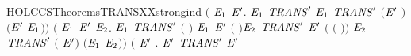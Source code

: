 \begin{SaveVerbatim}{HOLCCSTheoremsTRANSXXstrongind}
       \ensuremath{(}\HOLSymConst{\HOLTokenForall{}}  \ensuremath{\HOLBoundVar{E}\sb{\mathrm{1}}} \ensuremath{\HOLBoundVar{E}\sp{\prime}}.
             \HOLTokenTransBegin{}\HOLTokenTransEnd \ensuremath{\HOLBoundVar{E}\sb{\mathrm{1}}} \HOLSymConst{\HOLTokenConj{}} \ensuremath{\HOLBoundVar{TRANS}\sp{\prime}}   \ensuremath{\HOLBoundVar{E}\sb{\mathrm{1}}} \HOLSymConst{\HOLTokenImp{}}
            \ensuremath{\HOLBoundVar{TRANS}\sp{\prime}} \ensuremath{(}\ensuremath{\HOLBoundVar{E}\sp{\prime}} \HOLSymConst{\ensuremath{\mid}} \ensuremath{)}  \ensuremath{(}\ensuremath{\HOLBoundVar{E}\sp{\prime}} \HOLSymConst{\ensuremath{\mid}} \ensuremath{\HOLBoundVar{E}\sb{\mathrm{1}}}\ensuremath{)}\ensuremath{)} \HOLSymConst{\HOLTokenConj{}}
       \ensuremath{(}\HOLSymConst{\HOLTokenForall{}}  \ensuremath{\HOLBoundVar{E}\sb{\mathrm{1}}} \ensuremath{\HOLBoundVar{E}\sp{\prime}} \ensuremath{\HOLBoundVar{E}\sb{\mathrm{2}}}.
             \HOLTokenTransBegin{} \HOLTokenTransEnd \ensuremath{\HOLBoundVar{E}\sb{\mathrm{1}}} \HOLSymConst{\HOLTokenConj{}} \ensuremath{\HOLBoundVar{TRANS}\sp{\prime}}  \ensuremath{(} \ensuremath{)} \ensuremath{\HOLBoundVar{E}\sb{\mathrm{1}}} \HOLSymConst{\HOLTokenConj{}}
            \ensuremath{\HOLBoundVar{E}\sp{\prime}} \HOLTokenTransBegin{} \ensuremath{(} \ensuremath{)}\HOLTokenTransEnd \ensuremath{\HOLBoundVar{E}\sb{\mathrm{2}}} \HOLSymConst{\HOLTokenConj{}}
            \ensuremath{\HOLBoundVar{TRANS}\sp{\prime}} \ensuremath{\HOLBoundVar{E}\sp{\prime}} \ensuremath{(} \ensuremath{(} \ensuremath{)}\ensuremath{)} \ensuremath{\HOLBoundVar{E}\sb{\mathrm{2}}} \HOLSymConst{\HOLTokenImp{}}
            \ensuremath{\HOLBoundVar{TRANS}\sp{\prime}} \ensuremath{(} \HOLSymConst{\ensuremath{\mid}} \ensuremath{\HOLBoundVar{E}\sp{\prime}}\ensuremath{)} \HOLConst{\ensuremath{\tau}} \ensuremath{(}\ensuremath{\HOLBoundVar{E}\sb{\mathrm{1}}} \HOLSymConst{\ensuremath{\mid}} \ensuremath{\HOLBoundVar{E}\sb{\mathrm{2}}}\ensuremath{)}\ensuremath{)} \HOLSymConst{\HOLTokenConj{}}
       \ensuremath{(}\HOLSymConst{\HOLTokenForall{}}  \ensuremath{\HOLBoundVar{E}\sp{\prime}}  .
             \HOLTokenTransBegin{}\HOLTokenTransEnd \ensuremath{\HOLBoundVar{E}\sp{\prime}} \HOLSymConst{\HOLTokenConj{}} \ensuremath{\HOLBoundVar{TRANS}\sp{\prime}}   \ensuremath{\HOLBoundVar{E}\sp{\prime}} \HOLSymConst{\HOLTokenConj{}}

\end{SaveVerbatim}
